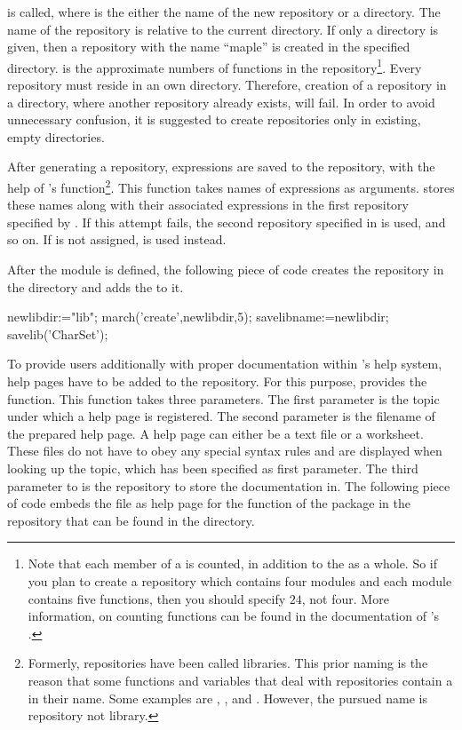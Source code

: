 is called, where  is the either the name of the new repository or a directory. The name of the repository is relative to the current directory. If only a directory is given, then a repository with the name ``maple'' is created in the specified directory.  is the approximate numbers of functions in the repository\footnote{Note that each member of a  is counted, in addition to the  as a whole. So if you plan to create a repository which contains four modules and each module contains five functions, then you should specify $24$, not four. More information, on counting functions can be found in the documentation of \Maple's .}. 
Every \Maple repository must reside in an own directory. Therefore, creation of a repository in a directory, where another repository already exists, will fail. In order to avoid unnecessary confusion, it is suggested to create repositories only in existing, empty directories.

After generating a \Maple repository, expressions are saved to the repository, with the help of \Maple's  function\footnote{Formerly, \Maple repositories have been called libraries. This prior naming is the reason that some functions and variables that deal with repositories contain a  in their name. Some examples are , , and . However, the pursued name is repository not library.}. This function takes names of expressions as arguments. \Maple stores these names along with their associated expressions in the first repository specified by . If this attempt fails, the second repository specified in  is used, and so on. If  is not assigned,  is used instead.

After the module  is defined, the following piece of code creates the \Maple repository in the directory  and adds the   to it.

\begin{mapleprogram}
newlibdir:="lib";
march('create',newlibdir,5);
savelibname:=newlibdir;
savelib('CharSet');
\end{mapleprogram}

To provide users additionally with proper documentation within \Maple's help system, help pages have to be added to the repository. For this purpose, \Maple provides the  function. This function takes three parameters. The first parameter is the topic under which a help page is registered. The second parameter is the filename of the prepared help page. A help page can either be a text file or a \Maple worksheet. These files do not have to obey any special syntax rules and are displayed when looking up the topic, which has been specified as first parameter. The third parameter to  is the repository to store the documentation in. The following piece of code embeds the file  as help page for the function  of the package  in the \Maple repository that can be found in the  directory.

